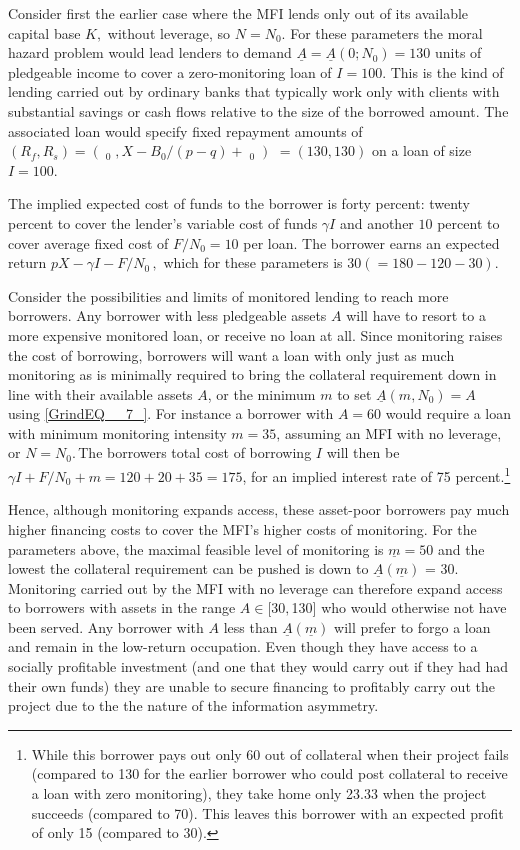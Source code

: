 \documentclass{article} %
\begin{document}
Consider first the earlier case where the MFI lends only out of its available capital base $K,$ without leverage, so $N=N_{0} $.   For these parameters the moral hazard problem would lead lenders to demand $\underline{A}=\underline{A}(0;N_{0} )=130$ units of pledgeable income to cover a zero-monitoring loan of $I=100$.   This is the kind of lending carried out by ordinary banks that typically work only with clients with substantial savings or cash flows relative to the size of the borrowed amount.  The associated loan would specify fixed repayment amounts of $(R_{f} ,R_{s} )=({\mathop{\underline{A}}\nolimits_{0}} ,X-B_{0} /(p-q)+{\mathop{\underline{A}}\nolimits_{0}} )$ $=(130,130)$ on a loan of size $I=100.$ 

The implied expected cost of funds to the borrower is forty percent: twenty percent to cover the lender's variable cost of funds $\gamma I$ and another $10$ percent to cover average fixed cost of $F/N_{0} =10$ per loan.  The borrower earns an expected return $pX-\gamma I-F/N_{0} \, ,$ which for these parameters is $30(=180-120-30).$ 

Consider the possibilities and limits of monitored lending to reach more borrowers. Any borrower with less pledgeable assets $A$ will have to resort to a more expensive monitored loan, or receive no loan at all.  Since monitoring raises the cost of borrowing, borrowers will want a loan with only just as much monitoring as is minimally required to bring the collateral requirement down in line with their available assets $A$, or the minimum $m$ to set $\underline{A}(m,N_{0} )=A$ using \eqref{GrindEQ__7_}. $ $For instance a borrower with $A=60$ would require a loan with minimum monitoring intensity $m=35,\, $assuming an MFI with no leverage, or $N=N_{0} $.$\, $The borrowers total cost of borrowing $I$ will then be $\gamma I+F/N_{0} +m=120+20+35=175$, for an implied interest rate of 75 percent.\footnote{While this borrower pays out only 60 out of collateral when their project fails (compared to 130 for the earlier borrower who could post collateral to receive a loan with zero monitoring), they take home only 23.33 when the project succeeds (compared to 70). This leaves this borrower with an expected profit of only 15 (compared to 30).} 

Hence, although monitoring expands access, these asset-poor borrowers pay much higher financing costs to cover the MFI's higher costs of monitoring.  For the parameters above, the maximal feasible level of monitoring is $\underline{m}=50$ and the lowest the collateral requirement can be pushed is down to $\underline{A}(\underline{m})$ = 30.  Monitoring carried out by the MFI with no leverage can therefore expand access to borrowers with assets in the range $A\in [$30$,$130$]$ who would otherwise not have been served.  Any borrower with $A$ less than $\underline{A}(\underline{m})$ will prefer to forgo a loan and remain in the low-return occupation.  Even though they have access to a socially profitable investment (and one that they would carry out if they had had their own funds) they are unable to secure financing to profitably carry out the project due to the the nature of the information asymmetry. 
\end{document}
